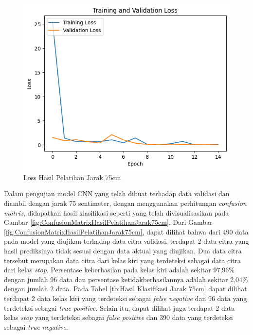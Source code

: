 \begin{figure} [H] \centering
  \includegraphics[scale=0.7]{gambar/75loss.png}
  \caption{Loss Hasil Pelatihan Jarak 75cm}
  \label{fig:LossHasilPelatihanJarak75cm}
\end{figure}

Dalam pengujian model CNN yang telah dibuat terhadap data validasi dan diambil dengan jarak 75 sentimeter, dengan menggunakan perhitungan \emph{confusion matrix}, didapatkan hasil klasifikasi seperti yang telah divisualisasikan pada Gambar \ref{fig:ConfusionMatrixHasilPelatihanJarak75cm}. Dari Gambar \ref{fig:ConfusionMatrixHasilPelatihanJarak75cm}, dapat dilihat bahwa dari 490 data pada model yang diujikan terhadap data citra validasi, terdapat 2 data citra yang hasil prediksinya tidak sesuai dengan data aktual yang diujikan. Dua data citra tersebut merupakan data citra dari kelas kiri yang terdeteksi sebagai data citra dari kelas \emph{stop}. Persentase keberhasilan pada kelas kiri adalah sekitar 97,96\% dengan jumlah 96 data dan persentase ketidakberhasilannya adalah sekitar 2,04\% dengan jumlah 2 data. Pada Tabel \ref{tb:Hasil Klasifikasi Jarak 75cm} dapat dilihat terdapat 2 data kelas kiri yang terdeteksi sebagai \emph{false negative} dan 96 data yang terdeteksi sebagai \emph{true positive}. Selain itu, dapat dilihat juga terdapat 2 data kelas \emph{stop} yang terdeteksi sebagai \emph{false positive} dan 390 data yang terdeteksi sebagai \emph{true negative}.

